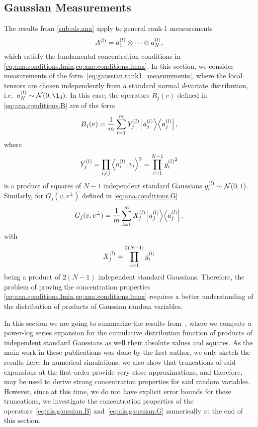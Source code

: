 \subsection{Gaussian Measurements}%
\label{sub:als.gaussian_measurements}

The results from \cref{sub:als.ana} apply to general rank-1 measurements
\[
  A^{(l)} = a^{(l)}_1 \otimes \cdots \otimes a^{(l)}_N,
  \label{eq:gaussian.rank1_measurements}
\]
which satisfy the fundamental concentration conditions in \cref{eq:ana.conditions.lmin,eq:ana.conditions.lmax}.
In this section, we consider measurements of the form~\eqref{eq:gaussian.rank1_measurements}, where the local tensors are chosen independently from a standard normal $d$-variate distribution, i.e.\ $a\ind{l}_N \sim \Normal(0, \1_d)$.
In this case, the operators $B_j(v)$ defined in \cref{eq:ana.conditions.B} are of the form
\[
  \label{eq:als.gaussian.B}
  B_j(v) = \frac{1}{m} \sum_{l=1}^m Y_j^{(l)} \left| a^{(l)}_j \middle\rangle\middle\langle a^{(l)}_j \right|,
\]
where
\[
  Y_j^{(l)} = \prod_{i \neq j} \Braket{a_i^{(l)}, v_i}^2 = \prod_{i = 1}^{N - 1} {g^{(l)}_i}^2
\]
is a product of squares of $N - 1$ independent standard Gaussians $g^{(l)}_i \sim \mathcal{N}(0, 1)$.
Similarly, for $G_j(v, v^\perp)$ defined in \cref{eq:ana.conditions.G}
\[
  \label{eq:als.gaussian.G}
  G_j(v, v^\perp) = \frac{1}{m} \sum_{l=1}^m X_j^{(l)} \left| a^{(l)}_j \middle\rangle\middle\langle a^{(l)}_j \right|,
\]
with
\[
  X_j^{(l)} = \prod_{i = 1}^{2(N - 1)} {g^{(l)}_i}
\]
being a product of $2(N - 1)$ independent standard Gaussians.
Therefore, the problem of proving the concentration properties \cref{eq:ana.conditions.lmin,eq:ana.conditions.lmax} requires a better understanding of the distribution of products of Gaussian random variables.

In this section we are going to summarize the results from~\cite{Stojanac_2017_On,Stojanac_2017_Ona}, where we compute a power-log series expansion for the cumulative distribution function of products of independent standard Gaussians as well their absolute values and squares.
As the main work in these publications was done by the first author, we only sketch the results here.
In numerical simulations, we also show that truncations of said expansions at the first-order provide very close approximations, and therefore, may be used to derive strong concentration properties for said random variables.
However, since at this time, we do not have explicit error bounds for these truncations, we investigate the concentration properties of the operators~\eqref{eq:als.gaussian.B} and~\eqref{eq:als.gaussian.G} numerically at the end of this section.\\




